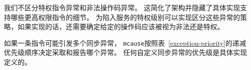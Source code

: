\begin{commentary}
我们不区分特权指令异常和非法操作码异常。 这简化了架构并隐藏了具体实现支持哪些更高权限指令的细节。 
为陷入服务的特权级别可以实现区分这些异常的策略，如果实现的话，还需要确定给定的操作码应该被视为非法还是特权。
\end{commentary}

\iffalse
If an instruction may raise multiple synchronous exceptions, the
decreasing priority order of Table~\ref{exception-priority}
indicates which exception is taken and reported in {\tt mcause}.
The priority of any custom synchronous exceptions is implementation-defined.
\fi

如果一条指令可能引发多个同步异常，
{\tt mcause}按照表~\ref{exception-priority}的递减优先级顺序决定采取和报告哪个异常。 
任何自定义同步异常的优先级是具体实现定义的。


